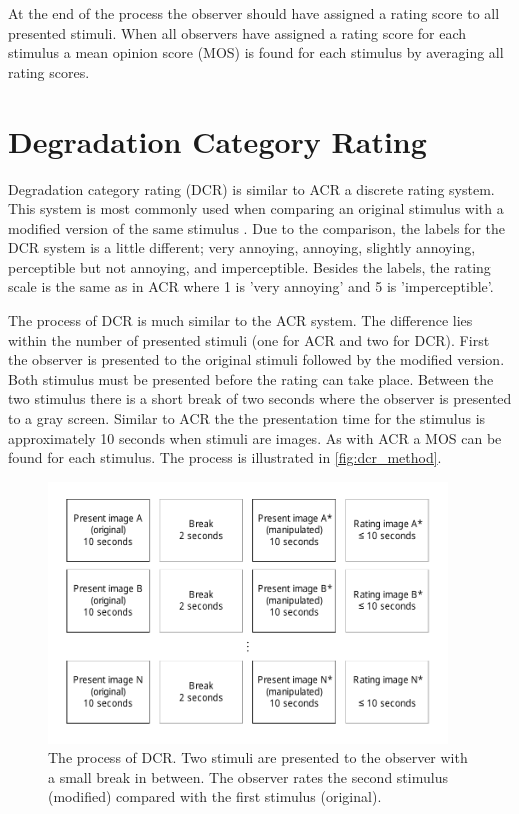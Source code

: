 At the end of the process the observer should have assigned a rating score to all presented stimuli. When all observers have assigned a rating score for each stimulus a mean opinion score (MOS) is found for each stimulus by averaging all rating scores.


\section{Degradation Category Rating} %
\label{sec:dcr}

Degradation category rating (DCR) is similar to ACR a discrete rating system. This system is most commonly used when comparing an original stimulus with a modified version of the same stimulus \cite{ITU-TRecommendationP.9102008}. Due to the comparison, the labels for the DCR system is a little different; very annoying, annoying, slightly annoying, perceptible but not annoying, and imperceptible. Besides the labels, the rating scale is the same as in ACR where 1 is 'very annoying' and 5 is 'imperceptible'.

The process of DCR is much similar to the ACR system. The difference lies within the number of presented stimuli (one for ACR and two for DCR). First the observer is presented to the original stimuli followed by  the modified version. Both stimulus must be presented before the rating can take place. Between the two stimulus there is a short break of two seconds where the observer is presented to a gray screen. Similar to ACR the the presentation time for the stimulus is approximately 10 seconds when stimuli are images. As with ACR a MOS can be found for each stimulus. The process is illustrated in \autoref{fig:dcr_method}. 

\begin{figure}[H]
	\centering
	\includegraphics[width = 300pt]{Img/DCR.pdf}
	\caption{The process of DCR. Two stimuli are presented to the observer with a small break in between. The observer rates the second stimulus (modified) compared with the first stimulus (original).}
	\label{fig:dcr_method}
\end{figure}

